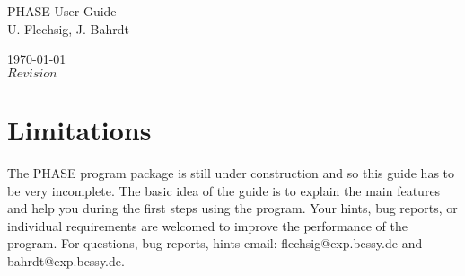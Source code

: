 \documentclass[12pt,a4paper,dvips]{report}
\begin{document}
  \thispagestyle{empty}
  

  \HRule
  \begin {flushright}
  {\Huge PHASE  User Guide}\\[5mm] 
  {\Large U. Flechsig, J. Bahrdt}
  \end{flushright}
  \HRule
  \begin{center}
    \today \\[1cm]
   $Revision$	

  \end{center}

\pagebreak

\section*{Limitations}
The PHASE program package is still under construction and so this guide has to
be very incomplete. The basic idea of the guide is to explain the main features
and help you during the first steps using the program. Your hints, bug reports,
or individual requirements are welcomed to improve the performance of the 
program. For questions, bug reports, hints email: flechsig@exp.bessy.de and
bahrdt@exp.bessy.de.

  \tableofcontents
  \listoffigures
  
  
  
  
  
  
       
\end{document}
